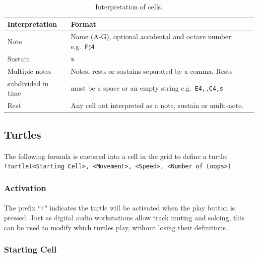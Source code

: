 \begin{table}[htb]
\centering
\vspace{1pt}
\begin{tabular}{|l|l|} \hline
\textbf{Interpretation}&\textbf{Format}\\ \hline
Note& Name (A-G), optional accidental and octave number e.g.~\texttt{F$\sharp$4}\\ \hline
Sustain& \texttt{s}\\ \hline
Multiple notes& Notes, rests or sustains separated by a comma. Rests \\
subdivided in time& must be a space or an empty string e.g.~\texttt{E4,,C4,s}\\ \hline
Rest& Any cell not interpreted as a note, sustain or multi-note. \\ \hline
\end{tabular}
\caption{Interpretation of cells.\label{tab:cells}}
\end{table}

\subsection{Turtles}

\paragraph{} The following formula is enetered into a cell in the grid to define a turtle:\\
\texttt{!turtle(<Starting Cell>, <Movement>, <Speed>, <Number of Loops>)}

\vspace{-5pt}
\subsubsection{Activation}

\paragraph{} The prefix ``\texttt{!}" indicates the turtle will be activated when the play button is pressed. Just as digital audio workstations allow track muting and soloing, this can be used to modify which turtles play, without losing their definitions.

\vspace{-5pt}
\subsubsection{Starting Cell}

